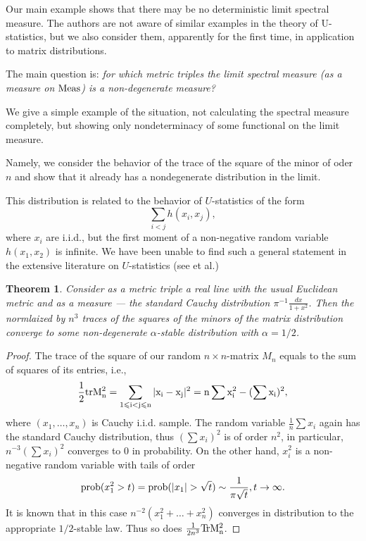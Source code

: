 \documentclass[11pt]{article}
\newcommand{\tr}{\rm{T\!r}}
\newcommand{\Meas}{\rm{Meas}}
\newtheorem{theorem}{Theorem}
\begin{document}
Our main example shows that there may be no deterministic limit spectral measure.
The authors are not aware of similar examples in the theory of U-statistics, but we also consider them, apparently for the first time, in application to matrix distributions.

The main question is:
 \emph{for which metric triples the limit spectral measure (as a measure on $\Meas$) is
 a non-degenerate measure?}

 We give a simple example of the situation, not calculating the spectral measure completely, but showing only
 nondeterminacy of some functional on the limit measure.

 Namely, we consider the behavior of the trace of the square of the minor of oder $n$
 and show
 that it already has a nondegenerate distribution in the limit.

 This distribution is related to the behavior of $U$-statistics of the form $$\sum_{i<j} h(x_i,x_j),$$
 where $x_i$ are i.i.d., but the first moment of a non-negative random variable
 $h(x_1,x_2)$ is infinite. We have been unable to find such a general statement in the extensive literature on
 $U$-statistics (see \cite{KB,BG} et al.)

 \begin{theorem}
 Consider as a metric triple a real line with the usual Euclidean metric and
 as a measure --- the standard Cauchy distribution $\pi^{-1}\frac{dx}{1+x^2}$.
 Then the normlaized by $n^3$ traces of the squares of the minors of the matrix distribution 
 converge to some non-degenerate $\alpha$-stable distribution with $\alpha=1/2$.
   \end{theorem}

   \begin{proof}
   The trace of the square of our random $n\times n$-matrix $M_n$ equals to the sum of squares of its entries, i.e.,
   $$\frac12 \rm tr M_n^2=\sum_{1\leqslant i<j\leqslant n} |x_i-x_j|^2=n\sum x_i^2-(\sum x_i)^2,$$
   where $(x_1,\ldots,x_n)$ is Cauchy i.i.d. sample.
  The random variable $\frac 1n \sum x_i$ again has the standard Cauchy distribution, thus 
   $(\sum x_i)^2$ is of order $n^2$, in particular,  $n^{-3}(\sum x_i)^2$ converges to 0 in probability. On the other hand, $x_i^2$ 
   is a non-negative random variable with tails of order $${\rm prob} (x_1^2>t)={\rm prob} (|x_1|>\sqrt{t})\sim \frac1{\pi \sqrt{t}}, t\to \infty.$$
   It is known \cite{IL} that in this case $n^{-2}(x_1^2+\ldots+x_n^2)$ 
   converges in distribution to the appropriate $1/2$-stable law. Thus so does $\frac1{2n^3} \tr M_n^2$.
   \end{proof}
\end{document}
